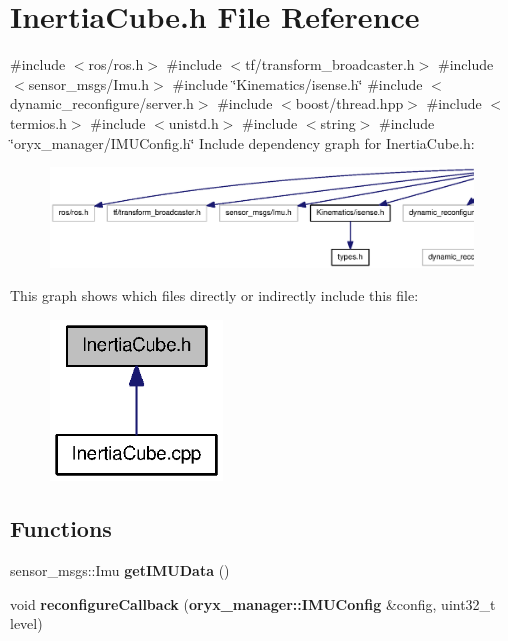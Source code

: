 \section{\-Inertia\-Cube.\-h \-File \-Reference}
\label{InertiaCube_8h}
{\ttfamily \#include $<$ros/ros.\-h$>$}\*
{\ttfamily \#include $<$tf/transform\-\_\-broadcaster.\-h$>$}\*
{\ttfamily \#include $<$sensor\-\_\-msgs/\-Imu.\-h$>$}\*
{\ttfamily \#include \char`\"{}\-Kinematics/isense.\-h\char`\"{}}\*
{\ttfamily \#include $<$dynamic\-\_\-reconfigure/server.\-h$>$}\*
{\ttfamily \#include $<$boost/thread.\-hpp$>$}\*
{\ttfamily \#include $<$termios.\-h$>$}\*
{\ttfamily \#include $<$unistd.\-h$>$}\*
{\ttfamily \#include $<$string$>$}\*
{\ttfamily \#include \char`\"{}oryx\-\_\-manager/\-I\-M\-U\-Config.\-h\char`\"{}}\*
\-Include dependency graph for \-Inertia\-Cube.\-h\-:
\nopagebreak
\begin{figure}[H]
\begin{center}
\leavevmode
\includegraphics[width=350pt]{InertiaCube_8h__incl}
\end{center}
\end{figure}
\-This graph shows which files directly or indirectly include this file\-:
\nopagebreak
\begin{figure}[H]
\begin{center}
\leavevmode
\includegraphics[width=130pt]{InertiaCube_8h__dep__incl}
\end{center}
\end{figure}
\subsection*{\-Functions}
\begin{DoxyCompactItemize}
\item 
sensor\-\_\-msgs\-::\-Imu {\bf get\-I\-M\-U\-Data} ()
\item 
void {\bf reconfigure\-Callback} ({\bf oryx\-\_\-manager\-::\-I\-M\-U\-Config} \&config, uint32\-\_\-t level)
\end{DoxyCompactItemize}
